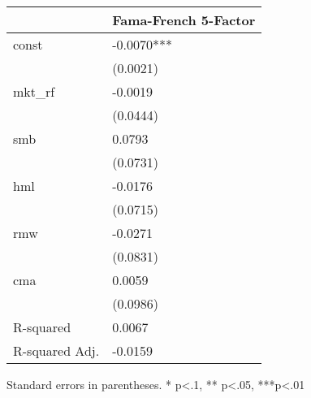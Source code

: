 \begin{table}
\caption{}
\label{}
\begin{center}
\begin{tabular}{ll}
\hline
               & Fama-French 5-Factor  \\
\hline
const          & -0.0070***            \\
               & (0.0021)              \\
mkt\_rf        & -0.0019               \\
               & (0.0444)              \\
smb            & 0.0793                \\
               & (0.0731)              \\
hml            & -0.0176               \\
               & (0.0715)              \\
rmw            & -0.0271               \\
               & (0.0831)              \\
cma            & 0.0059                \\
               & (0.0986)              \\
R-squared      & 0.0067                \\
R-squared Adj. & -0.0159               \\
\hline
\end{tabular}
\end{center}
\end{table}
\bigskip
Standard errors in parentheses. \newline 
* p<.1, ** p<.05, ***p<.01